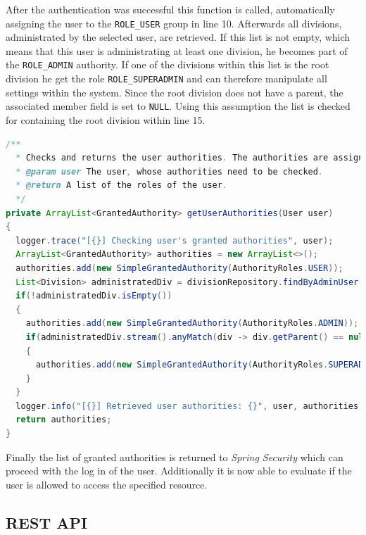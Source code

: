 After the authentication was successful this function is called, automatically assigning the user to the \texttt{ROLE\_USER} group in line 10. Afterwards all divisions, administrated by the selected user, are retrieved. If this list is not empty, which means that this user is administrating at least one division, he becomes part of the \texttt{ROLE\_ADMIN} authority. If one of the divisions within this list is the root division he get the role \texttt{ROLE\_SUPERADMIN} and can therefore manipulate all settings within the system. Since the root division does not have a parent, the associated member field is set to \texttt{NULL}. Using this assumption the list is checked for containing the root division within line 15.

\begin{lstlisting}[caption ={User role assessment executed upon authentication (slightly modified for readability)}, label=lst:UserAuthentication, language=Java]
/**
  * Checks and returns the user authorities. The authorities are assigned according to the {@link de.steilerdev.myVerein.server.security.UserAuthenticationService.AuthorityRoles AuthorityRoles} enum.
  * @param user The user, whose authorities need to be checked.
  * @return A list of the roles of the user.
  */
private ArrayList<GrantedAuthority> getUserAuthorities(User user)
{
  logger.trace("[{}] Checking user's granted authorities", user);
  ArrayList<GrantedAuthority> authorities = new ArrayList<>();
  authorities.add(new SimpleGrantedAuthority(AuthorityRoles.USER));
  List<Division> administratedDiv = divisionRepository.findByAdminUser(user);
  if(!administratedDiv.isEmpty())
  {
    authorities.add(new SimpleGrantedAuthority(AuthorityRoles.ADMIN));
    if(administratedDiv.stream().anyMatch(div -> div.getParent() == null))
    {
      authorities.add(new SimpleGrantedAuthority(AuthorityRoles.SUPERADMIN));
    }
  }
  logger.info("[{}] Retrieved user authorities: {}", user, authorities);
  return authorities;
}
\end{lstlisting}

Finally the list of granted authorities is returned to \emph{Spring Security} which can proceed with the log in of the user. Additionally it is now able to evaluate if the user is allowed to access the specified resource.

\subsection{REST API}
\label{sec:REST}

